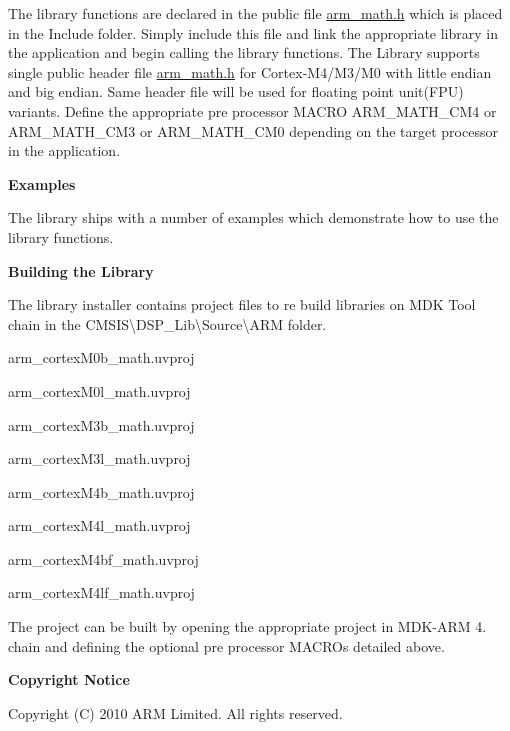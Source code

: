 The library functions are declared in the public file {\ttfamily \hyperlink{arm__math_8h}{arm\-\_\-math.\-h}} which is placed in the {\ttfamily Include} folder. Simply include this file and link the appropriate library in the application and begin calling the library functions. The Library supports single public header file {\ttfamily  \hyperlink{arm__math_8h}{arm\-\_\-math.\-h}} for Cortex-\/\-M4/\-M3/\-M0 with little endian and big endian. Same header file will be used for floating point unit(\-F\-P\-U) variants. Define the appropriate pre processor M\-A\-C\-R\-O A\-R\-M\-\_\-\-M\-A\-T\-H\-\_\-\-C\-M4 or A\-R\-M\-\_\-\-M\-A\-T\-H\-\_\-\-C\-M3 or A\-R\-M\-\_\-\-M\-A\-T\-H\-\_\-\-C\-M0 depending on the target processor in the application.

{\bfseries Examples}

The library ships with a number of examples which demonstrate how to use the library functions.

{\bfseries Building the Library}

The library installer contains project files to re build libraries on M\-D\-K Tool chain in the {\ttfamily C\-M\-S\-I\-S\textbackslash{}D\-S\-P\-\_\-\-Lib\textbackslash{}Source\textbackslash{}A\-R\-M} folder.
\begin{DoxyItemize}
\item arm\-\_\-cortex\-M0b\-\_\-math.\-uvproj
\item arm\-\_\-cortex\-M0l\-\_\-math.\-uvproj
\item arm\-\_\-cortex\-M3b\-\_\-math.\-uvproj
\item arm\-\_\-cortex\-M3l\-\_\-math.\-uvproj
\item arm\-\_\-cortex\-M4b\-\_\-math.\-uvproj
\item arm\-\_\-cortex\-M4l\-\_\-math.\-uvproj
\item arm\-\_\-cortex\-M4bf\-\_\-math.\-uvproj
\item arm\-\_\-cortex\-M4lf\-\_\-math.\-uvproj
\end{DoxyItemize}

The project can be built by opening the appropriate project in M\-D\-K-\/\-A\-R\-M 4. chain and defining the optional pre processor M\-A\-C\-R\-Os detailed above.

{\bfseries Copyright Notice}

Copyright (C) 2010 A\-R\-M Limited. All rights reserved. 